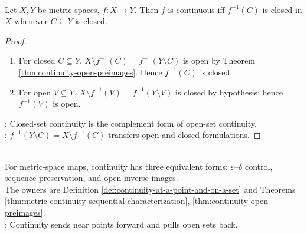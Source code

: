 \begin{corollary} \label{cor:continuity-closed-preimages} \\
Let $X,Y$ be metric spaces, $f:X\to Y$. Then $f$ is continuous iff $f^{-1}(C)$ is closed in $X$ whenever $C\subseteq Y$ is closed.
\begin{proof}
\begin{enumerate}[label=\roman*.]
\setlength{\itemsep}{0pt}
\item[$(\Rightarrow)$] For closed $C\subseteq Y$, $X\setminus f^{-1}(C)=f^{-1}(Y\setminus C)$ is open by Theorem \ref{thm:continuity-open-preimages}. Hence $f^{-1}(C)$ is closed.
\item[$(\Leftarrow)$] For open $V\subseteq Y$, $X\setminus f^{-1}(V)=f^{-1}(Y\setminus V)$ is closed by hypothesis; hence $f^{-1}(V)$ is open.
\end{enumerate}
: Closed-set continuity is the complement form of open-set continuity.\\
: $f^{-1}(Y\setminus C)=X\setminus f^{-1}(C)$ transfers open and closed formulations.
\end{proof}
\end{corollary}

\begin{perspective} \label{per:three-views-of-continuity} \\
For metric-space maps, continuity has three equivalent forms: $\varepsilon$--$\delta$ control, sequence preservation, and open inverse images.\\
The owners are Definition \ref{def:continuity-at-a-point-and-on-a-set} and Theorems \ref{thm:metric-continuity-sequential-characterization}, \ref{thm:continuity-open-preimages}.\\
: Continuity sends near points forward and pulls open sets back.
\end{perspective}

